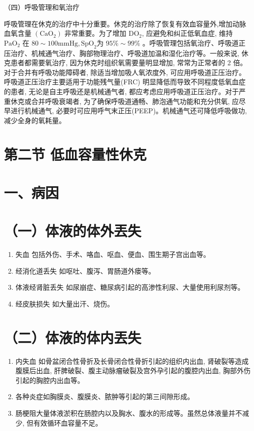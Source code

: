 \documentclass[10pt]{article}
\begin{document}
（四）呼吸管理和氧治疗

呼吸管理在休克的治疗中十分重要。休克的治疗除了恢复有效血容量外,增加动脉血氧含量 $\left(\mathrm{CaO}_{2}\right)$ 非常重要。为了增加 $\mathrm{DO}_{2}$, 应避免和纠正低氧血症, 维持 $\mathrm{PaO}_{2}$ 在 $80 \sim 100 \mathrm{mmHg}, \mathrm{SpO}_{2}$为 $95 \% \sim 99 \%$ 。呼吸管理包括氧治疗、呼吸道正压治疗、机械通气治疗、胸部物理治疗、呼吸道加温和湿化治疗等。一般来说, 休克患者都需要氧治疗, 因为休克时组织氧需要量明显增加, 常常为正常者的 2 倍。对于合并有呼吸功能障碍者, 除适当增加吸人氧浓度外, 可应用呼吸道正压治疗。呼吸道正压治疗主要适用于功能残气量(FRC) 明显降低而导致不同程度低氧血症的患者, 无论是自主呼吸还是机械通气者, 都应考虑应用呼吸道正压治疗。对于严重休克或合并呼吸衰竭者, 为了确保呼吸道通畅、肺泡通气功能和充分供氧, 应尽早进行机械通气, 必要时可应用呼气末正压(PEEP)。机械通气还可降低呼吸做功, 减少全身的氧耗量。

\section*{第二节 低血容量性休克}
\section*{一、病因}
\section*{（一）体液的体外丟失}
\begin{enumerate}
  \item 失血 包括外伤、手术、咯血、呕血、便血、围生期子宫出血等。

  \item 经消化道丢失 如呕吐、腹泻、胃肠道外瘘等。

  \item 体液经肾脏丢失 如尿崩症、糖尿病引起的高渗性利尿、大量使用利尿剂等。

  \item 经皮肤损失 如大量出汗、烧伤。

\end{enumerate}

\section*{（二）体液的体内丟失}
\begin{enumerate}
  \item 内失血 如骨盆闭合性骨折及长骨闭合性骨折引起的组织内出血, 肾破裂等造成腹膜后出血, 肝脾破裂、腹主动脉瘤破裂及宫外孕引起的腹腔内出血, 胸部外伤引起的胸腔内出血等。

  \item 各种炎症如胸膜炎、腹膜炎、脓肿等引起的第三间隙形成。

  \item 肠梗阻大量体液淤积在肠腔内以及胸水、腹水的形成等。虽然总体液量并不减少, 但有效循环血容量不足。

\end{enumerate}
\end{document}
